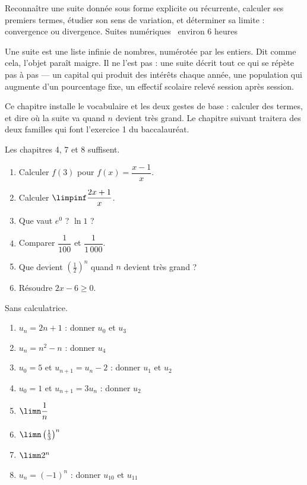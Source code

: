   {Reconnaître une suite donnée sous forme explicite ou récurrente, calculer
   ses premiers termes, étudier son sens de variation, et déterminer sa
   limite : convergence ou divergence.}
  {Suites numériques \textbullet\ environ 6 heures}

Une suite est une liste infinie de nombres, numérotée par les entiers. Dit
comme cela, l'objet paraît maigre. Il ne l'est pas : une suite décrit tout ce
qui se répète pas à pas — un capital qui produit des intérêts chaque année,
une population qui augmente d'un pourcentage fixe, un effectif scolaire relevé
session après session.

Ce chapitre installe le vocabulaire et les deux gestes de base : calculer des
termes, et dire où la suite va quand $n$ devient très grand. Le chapitre
suivant traitera des deux familles qui font l'exercice 1 du baccalauréat.

\begin{revision}
Les chapitres 4, 7 et 8 suffisent.

\begin{enumerate}[label=\textbf{\arabic*.}, leftmargin=*, itemsep=0.35em]
  \item Calculer $f(3)$ pour $f(x) = \dfrac{x-1}{x}$.
  \item Calculer $\limpinf \dfrac{2x+1}{x}$.
  \item Que vaut $e^{0}$ ? $\ln 1$ ?
  \item Comparer $\dfrac{1}{100}$ et $\dfrac{1}{1\,000}$.
  \item Que devient $\left(\frac12\right)^{n}$ quand $n$ devient très
        grand ?
  \item Résoudre $2x-6 \geq 0$.
\end{enumerate}
\end{revision}

\begin{automatismes}
Sans calculatrice.

\begin{enumerate}[label=\textbf{\alph*)}, leftmargin=*, itemsep=0.25em]
  \item $u_{n} = 2n+1$ : donner $u_{0}$ et $u_{3}$
  \item $u_{n} = n^{2}-n$ : donner $u_{4}$
  \item $u_{0} = 5$ et $u_{n+1} = u_{n}-2$ : donner $u_{1}$ et $u_{2}$
  \item $u_{0} = 1$ et $u_{n+1} = 3u_{n}$ : donner $u_{2}$
  \item $\limn \dfrac1n$
  \item $\limn \left(\frac13\right)^{n}$
  \item $\limn 2^{n}$
  \item $u_{n} = (-1)^{n}$ : donner $u_{10}$ et $u_{11}$
\end{enumerate}
\end{automatismes}

